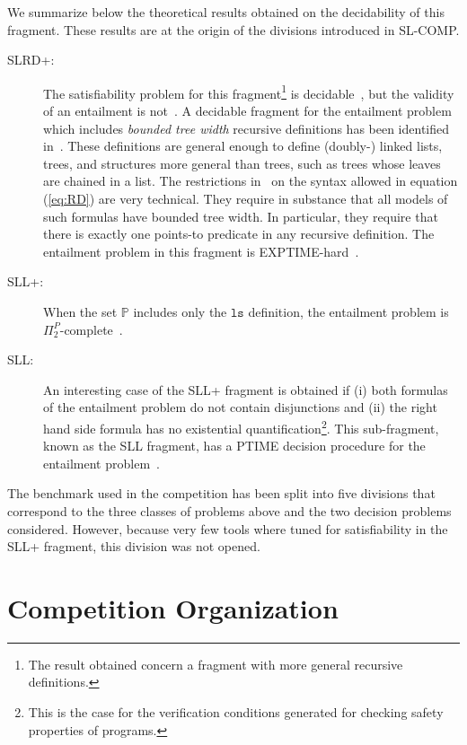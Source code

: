 \documentclass{llncs}
\newcommand{\preds}{\mathbb{P}}
\newcommand{\ls}{\mathtt{ls}}
\begin{document}
We summarize below the theoretical results obtained on the decidability of this fragment.
These results are at the origin of the divisions introduced in SL-COMP.
\begin{description}
\item[SLRD+:]
The satisfiability problem for this fragment\footnote{The result obtained concern a fragment with more general recursive definitions.} is decidable~\cite{BrotherstonFGNP13},
but the validity of an entailment is not~\cite{AntonopoulosGHKO14}.
%
A decidable fragment for the entailment problem which includes \emph{bounded tree width} recursive definitions has been identified in~\cite{IosifRS13}.
These definitions are general enough to define (doubly-) linked lists, trees,
and structures more general than trees, such as trees whose leaves are chained in
a list. 
The restrictions in~\cite{IosifRS13} on the syntax allowed in equation (\ref{eq:RD}) are very technical. They require in substance that all models of such formulas have bounded tree width. 
In particular, they require that there is exactly one points-to predicate in any recursive definition.
The entailment problem in this fragment is EXPTIME-hard~\cite{AntonopoulosGHKO14}.

\item[SLL+:]
When the set $\preds$ includes only the $\ls$ definition, 
the entailment problem is $\Pi^P_2$-complete~\cite{AntonopoulosGHKO14}.

\item[SLL:]
An interesting case of the SLL+ fragment is obtained if 
(i) both formulas of the entailment problem do not contain disjunctions and 
(ii) the right hand side formula has no existential quantification\footnote{This is the case for the verification conditions generated for checking safety properties of programs.}. 
This sub-fragment, known as the SLL fragment, has a PTIME decision procedure for the entailment problem~\cite{CookHOPW11}.
\end{description}

The benchmark used in the competition has been split into five divisions that correspond to the three classes of problems above and the two decision problems considered.
However, because very few tools where tuned for satisfiability in the SLL+ fragment, this division was not opened.



\section{Competition Organization}
\end{document}
